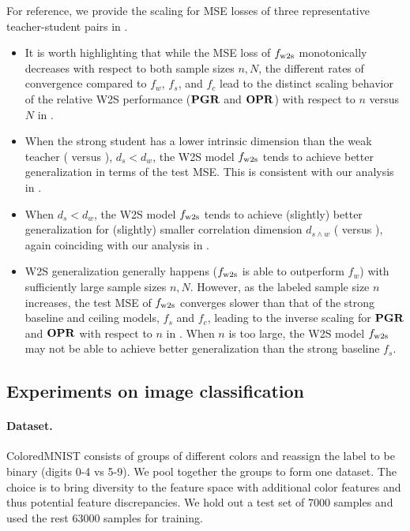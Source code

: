 For reference, we provide the scaling for MSE losses of three representative teacher-student pairs in . 
\begin{itemize}
    \item It is worth highlighting that while the MSE loss of $f_{\mathrm{w2s}}$ monotonically decreases with respect to both sample sizes $n,N$, the different rates of convergence compared to $f_w$, $f_s$, and $f_c$ lead to the distinct scaling behavior of the relative W2S performance ($\mathbf{PGR}$ and $\mathbf{OPR}$) with respect to $n$ versus $N$ in .
    \item When the strong student has a lower intrinsic dimension than the weak teacher (\cf {} versus ), $d_s < d_w$, the W2S model $f_{\mathrm{w2s}}$ tends to achieve better generalization in terms of the test MSE. This is consistent with our analysis in .
    \item When $d_s < d_w$, the W2S model $f_{\mathrm{w2s}}$ tends to achieve (slightly) better generalization for (slightly) smaller correlation dimension $d_{s \wedge w}$ (\cf {} versus ), again coinciding with our analysis in .
    \item W2S generalization generally happens (\ie $f_{\mathrm{w2s}}$ is able to outperform $f_w$) with sufficiently large sample sizes $n, N$. However, as the labeled sample size $n$ increases, the test MSE of $f_{\mathrm{w2s}}$ converges slower than that of the strong baseline and ceiling models, $f_s$ and $f_c$, leading to the inverse scaling for $\mathbf{PGR}$ and $\mathbf{OPR}$ with respect to $n$ in . When $n$ is too large, the W2S model $f_{\mathrm{w2s}}$ may not be able to achieve better generalization than the strong baseline $f_s$.
\end{itemize}




\subsection{Experiments on image classification}\label{apx:exp_img_cls}

\paragraph{Dataset.} ColoredMNIST \citep{arjovsky2019invariant} consists of groups of different colors and reassign the label to be binary (digits 0-4 vs 5-9). We pool together the groups to form one dataset. The choice is to bring diversity to the feature space with additional color features and thus potential feature discrepancies. We hold out a test set of 7000 samples and used the rest 63000 samples for training.

